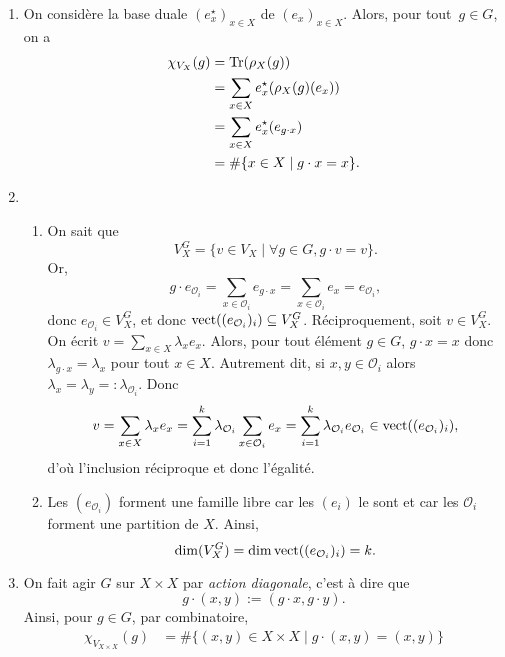 \documentclass[./main]{subfiles}
\begin{document}
  \begin{enumerate}
    \item On considère la base duale $(e^\star_x)_{x \in X}$ de $(e_x)_{x \in X}$.
      Alors, pour tout~$g \in G$, on a 
      \begin{align*}
        \chi_{V_X}(g) &= \operatorname{Tr}(\rho_X(g))\\
        &= \sum_{x \in X} e_x^\star(\rho_X(g)(e_x)) \\
        &= \sum_{x \in X} e_x^\star(e_{g \cdot x})\\
        &= \# \{x \in X  \mid g \cdot x = x\}
      .\end{align*}

    \item
      \begin{enumerate}
        \item On sait que \[
            V_X^G = \{v \in V_X  \mid \forall g \in G, g \cdot v = v\}
          .\]
          Or,  \[
            g \cdot e_{\mathcal{O}_i} = \sum_{x \in \mathcal{O}_i} e_{g \cdot x} = \sum_{x \in \mathcal{O}_i} e_x = e_{\mathcal{O}_i}
          ,\]donc $e_{\mathcal{O}_i} \in V_X^G$, et donc $\operatorname{vect} ((e_{\mathcal{O}_i})_i) \subseteq V_X^G$.
          Réciproquement, soit $v \in V_X^G$.
          On écrit $v = \sum_{x \in X} \lambda_x e_x$.
          Alors, pour tout élément $g  \in G$, $g \cdot x = x$ donc $\lambda_{g \cdot x} = \lambda_x$ pour tout $x \in X$.
          Autrement dit, si $x, y \in \mathcal{O}_i$ alors $\lambda_x = \lambda_y =: \lambda_{\mathcal{O}_i}$.
          Donc 
          \[
            v = \sum_{x \in X} \lambda_x e_x = \sum_{i=1}^k \lambda_{\mathcal{O}_i} \sum_{x \in \mathcal{O}_i} e_x = \sum_{i = 1}^k \lambda_{\mathcal{O}_i} e_{\mathcal{O}_i} \in \operatorname{vect}((e_{\mathcal{O}_i})_i)
          ,\] 
          d'où l'inclusion réciproque et donc l'égalité.
        \item Les $(e_{\mathcal{O}_i})$ forment une famille libre car les $(e_i)$ le sont et car les  $\mathcal{O}_i$ forment une partition de $X$.
          Ainsi, \[
          \dim (V_X^G) = \dim \operatorname{vect}((e_{\mathcal{O}_i})_i) = k
          .\]
      \end{enumerate}
    \item On fait agir $G$ sur $X \times X$ par \textit{action diagonale}, c'est à dire que \[
        g \cdot (x,y) := (g \cdot x, g\cdot y)
      .\]
      Ainsi, pour $g \in G$, par combinatoire,
      \begin{align*}
        \chi_{V_{X \times X}}(g)
        &= \# \{(x,y) \in X \times X  \mid g\cdot  (x,y) = (x,y) \}\\

\end{align*}
\end{enumerate}
\end{document}
